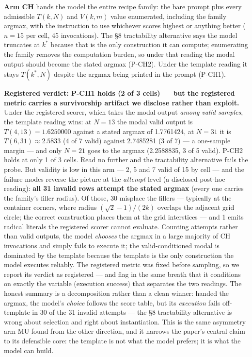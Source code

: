 \textbf{Arm CH} hands the model the entire recipe family: the bare prompt plus every admissible
$T(k, N)$ and $V(k, m)$ value enumerated, including the family argmax, with the instruction to
use whichever scores highest or anything better ($n = 15$ per cell, 45 invocations). The \S8
tractability alternative says the model truncates at $k^*$ because that is the only construction
it can compute; enumerating the family removes the computation burden, so under that reading
the modal output should become the stated argmax (P-CH2). Under the template reading it stays
$T(k^*, N)$ despite the argmax being printed in the prompt (P-CH1).

\textbf{Registered verdict: P-CH1 holds (2 of 3 cells) --- but the registered metric carries a
survivorship artifact we disclose rather than exploit.} Under the registered scorer, which
takes the modal output \emph{among valid samples}, the template reading wins: at $N = 13$ the modal
valid output is $T(4,13) = 1.6250000$ against a stated argmax of 1.7761424, at $N = 31$ it is
$T(6,31) \approx 2.5833$ (4 of 7 valid) against 2.7485281 (3 of 7) --- a one-sample margin --- and only
$N = 21$ goes to the argmax (2.2588835, 3 of 5 valid). P-CH2 holds at only 1 of 3 cells. Read no further and the tractability
alternative fails the probe. But validity is low in this arm --- 2, 5 and 7 valid of 15 by
cell --- and the failure modes reverse the picture at the \emph{attempt} level (a disclosed post-hoc reading): \textbf{all 31 invalid
rows attempt the stated argmax} (every one carries the family's filler radius). Of those,
30 misplace the fillers --- typically at the container corners, where radius $(\sqrt{2}-1)/(2k)$
overlaps the adjacent grid circle; the correct construction places them at the grid
interstices --- and 1 emits radical literals the registered scorer cannot evaluate. Counting
attempts rather than valid outputs, the model \emph{chooses} the argmax in a large majority of CH
invocations and simply fails to execute it; the valid-conditioned modal is dominated by the
template because the template is the only construction the model executes reliably. The
registered metric was fixed before sampling, so we report its verdict as registered --- and
flag in the same breath that it conditions on exactly the variable (execution success) that
separates the two readings. The honest summary is a decomposition rather than a clean winner: handed the
argmax, the model's \emph{choice} follows the score table, but its \emph{execution} fails off-template
in 30 of the 31 invalid attempts --- the \S8 tractability alternative is wrong about selection
and right about instantiation. This is the same asymmetry arm MU found from the other
direction, and it narrows the paper's central claim to its defensible core: the template is
not what the model prefers; it is what the model can build.

